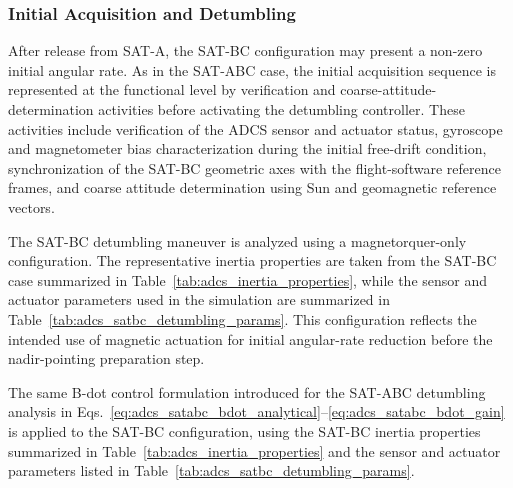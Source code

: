 \subsubsection{Initial Acquisition and Detumbling}
\label{subsub:adcs_satbc_detumbling}

After release from SAT-A, the SAT-BC configuration may present a non-zero initial angular rate. As in the SAT-ABC case, the initial acquisition sequence is represented at the functional level by verification and coarse-attitude-determination activities before activating the detumbling controller. These activities include verification of the ADCS sensor and actuator status, gyroscope and magnetometer bias characterization during the initial free-drift condition, synchronization of the SAT-BC geometric axes with the flight-software reference frames, and coarse attitude determination using Sun and geomagnetic reference vectors.

The SAT-BC detumbling maneuver is analyzed using a magnetorquer-only configuration. The representative inertia properties are taken from the SAT-BC case summarized in Table~\ref{tab:adcs_inertia_properties}, while the sensor and actuator parameters used in the simulation are summarized in Table~\ref{tab:adcs_satbc_detumbling_params}. This configuration reflects the intended use of magnetic actuation for initial angular-rate reduction before the nadir-pointing preparation step.

The same B-dot control formulation introduced for the SAT-ABC detumbling analysis in Eqs.~\eqref{eq:adcs_satabc_bdot_analytical}--\eqref{eq:adcs_satabc_bdot_gain} is applied to the SAT-BC configuration, using the SAT-BC inertia properties summarized in Table~\ref{tab:adcs_inertia_properties} and the sensor and actuator parameters listed in Table~\ref{tab:adcs_satbc_detumbling_params}.

